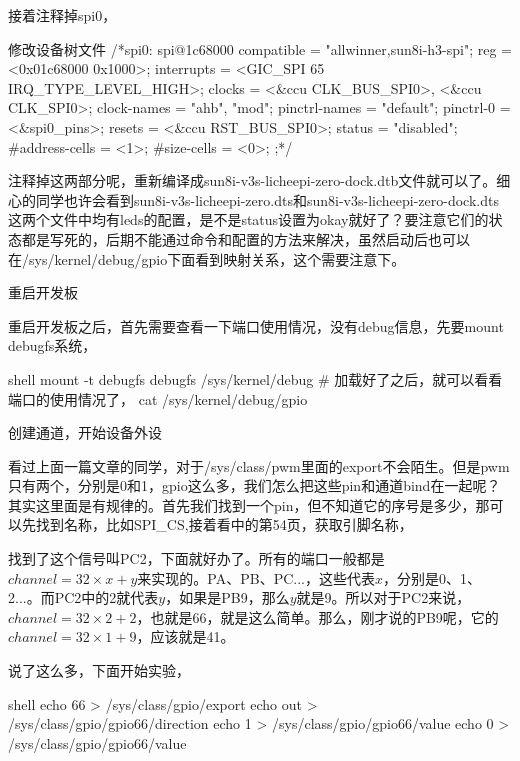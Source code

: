 \documentclass[lang=cn,newtx,10pt,scheme=chinese]{elegantbook}
\begin{document}
接着注释掉spi0，

\begin{mycode}{修改设备树文件}
/*spi0: spi@1c68000 {
    compatible = "allwinner,sun8i-h3-spi";
    reg = <0x01c68000 0x1000>;
    interrupts = <GIC_SPI 65 IRQ_TYPE_LEVEL_HIGH>;
    clocks = <&ccu CLK_BUS_SPI0>, <&ccu CLK_SPI0>;
    clock-names = "ahb", "mod";
    pinctrl-names = "default";
    pinctrl-0 = <&spi0_pins>;
    resets = <&ccu RST_BUS_SPI0>;
    status = "disabled";
    #address-cells = <1>;
    #size-cells = <0>;
};*/
\end{mycode}

注释掉这两部分呢，重新编译成sun8i-v3s-licheepi-zero-dock.dtb文件就可以了。细心的同学也许会看到sun8i-v3s-licheepi-zero.dts和sun8i-v3s-licheepi-zero-dock.dts这两个文件中均有leds的配置，是不是status设置为okay就好了？要注意它们的状态都是写死的，后期不能通过命令和配置的方法来解决，虽然启动后也可以在/sys/kernel/debug/gpio下面看到映射关系，这个需要注意下。

重启开发板

重启开发板之后，首先需要查看一下端口使用情况，没有debug信息，先要mount debugfs系统，

\begin{mycode}{shell}
mount -t debugfs debugfs /sys/kernel/debug
# 加载好了之后，就可以看看端口的使用情况了，
cat /sys/kernel/debug/gpio
\end{mycode}

创建通道，开始设备外设

看过上面一篇文章的同学，对于/sys/class/pwm里面的export不会陌生。但是pwm只有两个，分别是0和1，gpio这么多，我们怎么把这些pin和通道bind在一起呢？其实这里面是有规律的。首先我们找到一个pin，但不知道它的序号是多少，那可以先找到名称，比如SPI\_CS,接着看中的第54页，获取引脚名称，

找到了这个信号叫PC2，下面就好办了。所有的端口一般都是$channel = 32 \times x+y$来实现的。PA、PB、PC...，这些代表$x$，分别是0、1、2...。而PC2中的2就代表$y$，如果是PB9，那么$y$就是9。所以对于PC2来说，$channel = 32 \times 2+ 2$，也就是66，就是这么简单。那么，刚才说的PB9呢，它的$channel = 32 \times 1 + 9$，应该就是41。

说了这么多，下面开始实验，

\begin{mycode}{shell}
echo 66 > /sys/class/gpio/export
echo out > /sys/class/gpio/gpio66/direction
echo 1 > /sys/class/gpio/gpio66/value
echo 0 > /sys/class/gpio/gpio66/value
\end{mycode}
\end{document}
